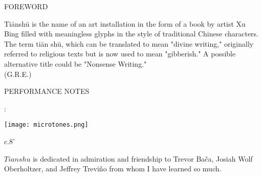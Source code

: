 \documentclass[10pt]{article}
\begin{document}
\vspace*{0.5\baselineskip}

\begin{center}
\huge FOREWORD
\end{center}

\begin{center}
Ti\=ansh\=u is the name of an art installation in the form of a book by artist Xu Bing filled with meaningless glyphs in the style of traditional Chinese characters. The term ti\=an sh\=u, which can be translated to mean "divine writing," originally referred to religious texts but is now used to mean "gibberish." A possible alternative title could be "Nonsense Writing."\\
\phantom{text} \hfill (G.R.E.)
  \end{center}
  
\vspace*{10\baselineskip}

\begin{center}
\huge PERFORMANCE NOTES
\end{center}

\begin{center}
:
\end{center}

\begin{center}
\texttt{[image: microtones.png]}
\end{center}

\vspace*{30\baselineskip}

\begin{center}
c.8'
\end{center}

\vspace*{2\baselineskip}

\begin{center}
$Tianshu$ is dedicated in admiration and friendship to Trevor Ba\v{c}a, Josiah Wolf Oberholtzer, and Jeffrey Trevi\~{n}o from whom I have learned so much.
\end{center}
\end{document}
